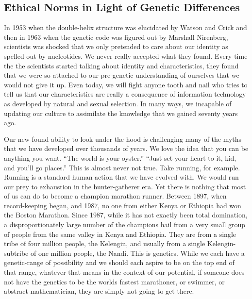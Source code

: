 \subsection{Ethical Norms in Light of Genetic Differences}

In 1953 when the double-helix structure was elucidated by Watson and Crick and then in 1963 when the genetic code was figured out by Marshall Nirenberg, scientists was shocked that we only pretended to care about our identity as spelled out by nucleotides.
We never really accepted what they found.
Every time the the scientists started talking about identity and characteristics, they found that we were so attached to our pre-genetic understanding of ourselves that we would not give it up.
Even today, we will fight anyone tooth and nail who tries to tell us that our characteristics are really a consequence of information technology as developed by natural and sexual selection.
In many ways, we incapable of updating our culture to assimilate the knowledge that we gained seventy years ago.

Our new-found ability to look under the hood is challenging many of the myths that we have developed over thousands of years.
We love the idea that you can be anything you want.
``The world is your oyster.''
``Just set your heart to it, kid, and you'll go places.''
This is almost never not true.
Take running, for example.
Running is a standard human action that we have evolved with.
We would run our prey to exhaustion in the hunter-gatherer era.
Yet there is nothing that most of us can do to become a champion marathon runner.
Between 1897, when record-keeping began, and 1987, no one from either Kenya or Ethiopia had won the Boston Marathon.
Since 1987, while it has not exactly been total domination, a disproportionately large number of the champions hail from a very small group of people from the same valley in Kenya and Ethiopia.
They are from a single tribe of four million people, the Kelengin, and usually from a single Kelengin-subtribe of one million people, the Nandi.
This is genetics.
While we each have a genetic-range of possibility and we should each aspire to be on the top end of that range, whatever that means in the context of our potential, if someone does not have the genetics to be the worlds fastest marathoner, or swimmer, or abstract mathematician, they are simply not going to get there.

